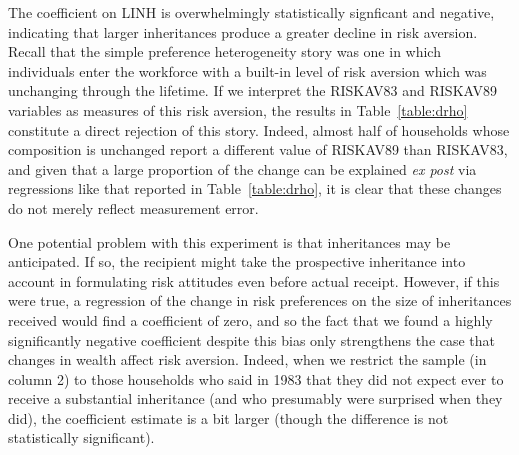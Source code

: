 \documentclass[12pt]{article}
\begin{document}
{\normalsize The coefficient on LINH is overwhelmingly statistically
signficant and negative, indicating that larger inheritances produce a
greater decline in risk aversion. Recall that the simple preference
heterogeneity story was one in which individuals enter the workforce with a
built-in level of risk aversion which was unchanging through the lifetime.
If we interpret the RISKAV83 and RISKAV89 variables as measures of this risk
aversion, the results in Table~\ref{table:drho} constitute a direct
rejection of this story. Indeed, almost half of households whose composition
is unchanged report a different value of RISKAV89 than RISKAV83, and given
that a large proportion of the change can be explained \textit{ex post} via
regressions like that reported in Table~\ref{table:drho}, it is clear that
these changes do not merely reflect measurement error. }

{\normalsize One potential problem with this experiment is that inheritances
may be anticipated. If so, the recipient might take the prospective
inheritance into account in formulating risk attitudes even before actual
receipt. However, if this were true, a regression of the change in risk
preferences on the size of inheritances received would find a coefficient of
zero, and so the fact that we found a highly significantly negative
coefficient despite this bias only strengthens the case that changes in
wealth affect risk aversion. Indeed, when we restrict the sample (in column
2) to those households who said in 1983 that they did not expect ever to
receive a substantial inheritance (and who presumably were surprised when
they did), the coefficient estimate is a bit larger (though the difference
is not statistically significant). }
\end{document}
